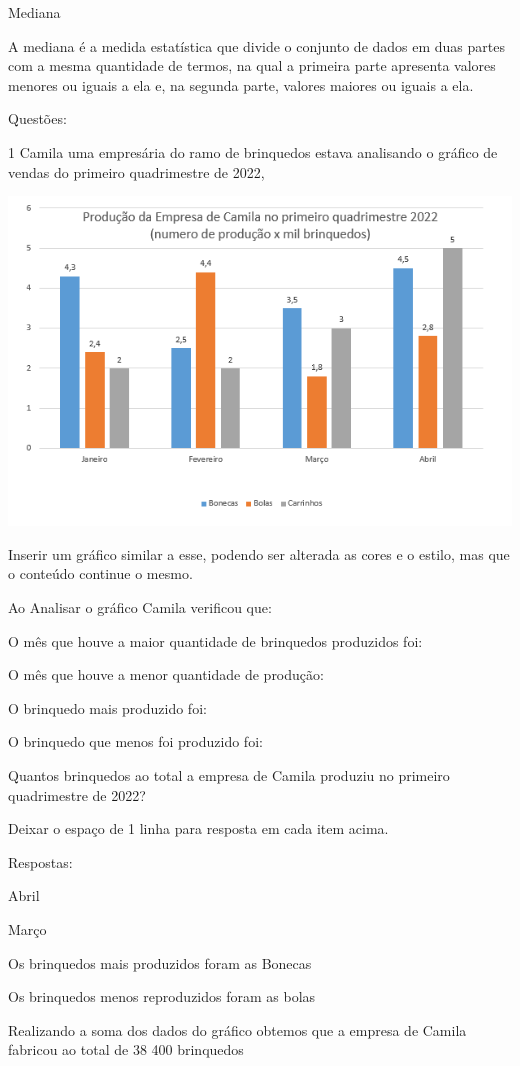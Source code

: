 Mediana

A mediana é a medida estatística que divide o conjunto de dados em duas
partes com a mesma quantidade de termos, na qual a primeira parte
apresenta valores menores ou iguais a ela e, na segunda parte, valores
maiores ou iguais a ela.

Questões:

\num{1} Camila uma empresária do ramo de brinquedos estava analisando o
gráfico de vendas do primeiro quadrimestre de 2022,

\includegraphics[width=5\times 90625in,height=3\times 86458in]{./imgSAEB_8_MAT/media/image39.png}

Inserir um gráfico similar a esse, podendo ser alterada as cores e o
estilo, mas que o conteúdo continue o mesmo.

Ao Analisar o gráfico Camila verificou que:

\item O mês que houve a maior quantidade de brinquedos produzidos foi:
\item O mês que houve a menor quantidade de produção:
\item O brinquedo mais produzido foi:
\item O brinquedo que menos foi produzido foi:
\item Quantos brinquedos ao total a empresa de Camila produziu no primeiro
quadrimestre de 2022?

Deixar o espaço de 1 linha para resposta em cada item acima.

Respostas:

\item Abril
\item Março
\item Os brinquedos mais produzidos foram as Bonecas
\item Os brinquedos menos reproduzidos foram as bolas
\item Realizando a soma dos dados do gráfico obtemos que a empresa de
Camila fabricou ao total de 38 400 brinquedos

